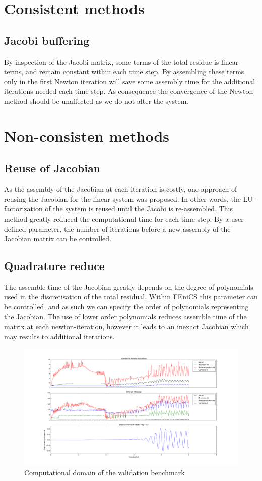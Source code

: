 \section{Consistent methods}
\subsection{Jacobi buffering}
By inspection of the Jacobi matrix, some terms of the total residue is linear terms, and remain constant within each time step. By assembling these terms only in the first Newton iteration will save some assembly time for the additional iterations needed each time step. As consequence the convergence of the Newton method should be unaffected as we do not alter the system.  

\section{Non-consisten methods}    
\subsection{Reuse of Jacobian}
As the assembly of the Jacobian at each iteration is costly, one approach of reusing the Jacobian for the linear system was proposed. In other words, the LU-factorization of the system is reused until the Jacobi is re-assembled. This method greatly reduced the computational time for each time step. By a user defined parameter, the number of iterations before a new assembly of the Jacobian matrix can be controlled. 

\subsection{Quadrature reduce}
The assemble time of the Jacobian greatly depends on the degree of polynomials used in the discretisation of the total residual. Within FEniCS this parameter can be controlled, and as such we can specify the order of polynomials representing the Jacobian. The use of lower order polynomials reduces assemble time of the matrix at each newton-iteration, however it leads to an inexact Jacobian which may results to additional iterations. 


\begin{figure}[h!]
\hspace*{-2.2cm}   
 \includegraphics[scale=0.36]{./Fig/itercompare.png}
 \caption{Computational domain of the validation benchmark}
\end{figure}

